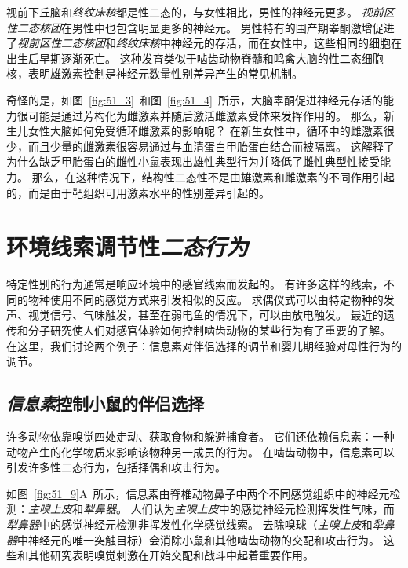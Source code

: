 视前下丘脑和\textit{终纹床核}都是性二态的，与女性相比，男性的神经元更多。
\textit{视前区性二态核团}在男性中也包含明显更多的神经元。
男性特有的围产期睾酮激增促进了\textit{视前区性二态核团}和\textit{终纹床核}中神经元的存活，而在女性中，这些相同的细胞在出生后早期逐渐死亡。
这种发育类似于啮齿动物脊髓和鸣禽大脑的性二态细胞核，表明雄激素控制是神经元数量性别差异产生的常见机制。


奇怪的是，如图~\ref{fig:51_3}~和图~\ref{fig:51_4}~所示，大脑睾酮促进神经元存活的能力很可能是通过芳构化为雌激素并随后激活雌激素受体来发挥作用的。
那么，新生儿女性大脑如何免受循环雌激素的影响呢？
在新生女性中，循环中的雌激素很少，而且少量的雌激素很容易通过与血清蛋白甲胎蛋白结合而被隔离。
这解释了为什么缺乏甲胎蛋白的雌性小鼠表现出雄性典型行为并降低了雌性典型性接受能力。
那么，在这种情况下，结构性二态性不是由雄激素和雌激素的不同作用引起的，而是由于靶组织可用激素水平的性别差异引起的。



\section{环境线索调节性\textit{二态行为}}

特定性别的行为通常是响应环境中的感官线索而发起的。
有许多这样的线索，不同的物种使用不同的感觉方式来引发相似的反应。
求偶仪式可以由特定物种的发声、视觉信号、气味触发，甚至在弱电鱼的情况下，可以由放电触发。
最近的遗传和分子研究使人们对感官体验如何控制啮齿动物的某些行为有了重要的了解。
在这里，我们讨论两个例子：信息素对伴侣选择的调节和婴儿期经验对母性行为的调节。



\subsection{\textit{信息素}控制小鼠的伴侣选择}
许多动物依靠嗅觉四处走动、获取食物和躲避捕食者。
它们还依赖信息素：一种动物产生的化学物质来影响该物种另一成员的行为。
在啮齿动物中，信息素可以引发许多性二态行为，包括择偶和攻击行为。


如图~\ref{fig:51_9}A~所示，信息素由脊椎动物鼻子中两个不同感觉组织中的神经元检测：\textit{主嗅上皮}和\textit{犁鼻器}。
人们认为\textit{主嗅上皮}中的感觉神经元检测挥发性气味，而\textit{犁鼻器}中的感觉神经元检测非挥发性化学感觉线索。
去除嗅球（\textit{主嗅上皮}和\textit{犁鼻器}中神经元的唯一突触目标）会消除小鼠和其他啮齿动物的交配和攻击行为。
这些和其他研究表明嗅觉刺激在开始交配和战斗中起着重要作用。


